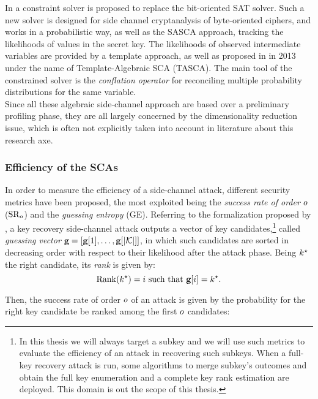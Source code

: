 In \cite{Oren2014} a constraint solver is proposed to replace the bit-oriented SAT solver. Such a new solver is designed for side channel cryptanalysis of byte-oriented ciphers, and works in a probabilistic way, as well as the SASCA approach, tracking the likelihoods of values in the secret key. The likelihoods of observed intermediate variables are provided by a template approach, as well as proposed in \cite{Oren:2013} in 2013 under the name of Template-Algebraic SCA (TASCA). The main tool  of the constrained solver is the \emph{conflation operator} for reconciling multiple probability distributions for the same variable.\\

Since all these algebraic side-channel approach are based over a preliminary profiling phase, they are all largely concerned by the dimensionality reduction issue, which is often not explicitly taken into account in literature about this research axe. 

\subsubsection{Efficiency of the SCAs}\label{sec:metrics}
In order to measure the efficiency of a side-channel attack, different security metrics have been proposed, the most exploited being the \emph{success rate of order} $o$ ($\mathrm{SR}_o$) and the \emph{guessing entropy} (GE). Referring to the formalization proposed by \cite{unifiedFramework}, a key recovery side-channel attack outputs a vector of key candidates,\footnote{In this thesis we will always target a subkey and we will use such metrics to evaluate the efficiency of an attack in recovering such subkeys. When a full-key recovery attack is run, some algorithms to merge subkey's outcomes and obtain the full key enumeration and a complete key rank estimation are deployed. This domain is out the scope of this thesis.} called {\em guessing vector} $\textbf{g} = \left[\textbf{g}[1], \dots, \textbf{g}[{\lvert \mathcal{K} \rvert}]\right]$, in which such candidates are sorted in decreasing order with respect to their likelihood after the attack phase. Being $k^\star$ the right candidate, its \emph{rank} is given by:
\begin{equation}
\mathrm{Rank}(k^\star) = i \mbox{ such that } \textbf{g}[i] = k^\star \mbox{.}
\end{equation}

Then, the success rate of order $o$ of an attack is given by the probability for the right key candidate be ranked among the first $o$ candidates: 

